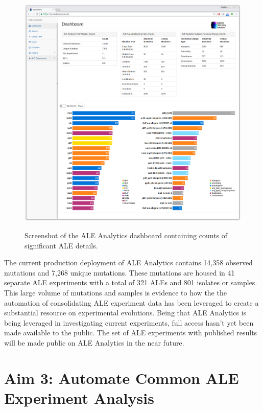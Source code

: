 \documentclass[12pt,final,masters,chapterheads]{ucsd}  %
\begin{document}
\begin{figure}[h!]
  \caption{Screenshot of the ALE Analytics dashboard containing counts of significant ALE details.}
  \centering
  \includegraphics[width=1\textwidth]{dashboard_screenshot.png}
  \label{fig:dashboard_screenshot}
\end{figure}

The current production deployment of ALE Analytics contains 14,358 observed mutations and 7,268 unique mutations. These mutations are housed in 41 separate ALE experiments with a total of 321 ALEs and 801 isolates or samples. This large volume of mutations and samples is evidence to how the the automation of consolidating ALE experiment data has been leveraged to create a substantial resource on experimental evolutions. Being that ALE Analytics is being leveraged in investigating current experiments, full access hasn't yet been made available to the public. The set of ALE experiments with published results will be made public on ALE Analytics in the near future.

% 
% 


\chapter{Aim 3: Automate Common ALE Experiment Analysis}
\end{document}
